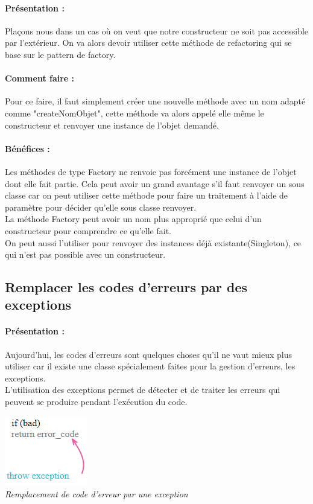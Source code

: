 \documentclass[a4paper,twoside,12pt,openright]{report}
\begin{document}
\paragraph{Présentation :}
Plaçons nous dans un cas où on veut que notre constructeur ne soit pas accessible par l'extérieur.
On va alors devoir utiliser cette méthode de refactoring qui se base sur le pattern de factory.

\paragraph{Comment faire :}
Pour ce faire, il faut simplement créer une nouvelle méthode avec un nom adapté comme "createNomObjet", cette méthode va alors appelé elle même le constructeur et renvoyer une instance de l'objet demandé.

\paragraph{Bénéfices :}
Les méthodes de type Factory ne renvoie pas forcément une instance de l'objet dont elle fait partie. Cela peut avoir un grand avantage s'il faut renvoyer un sous classe car on peut utiliser cette méthode pour faire un traitement à l'aide de paramètre pour décider qu'elle sous classe renvoyer.\\
La méthode Factory peut avoir un nom plus approprié que celui d'un constructeur pour comprendre ce qu'elle fait.\\
On peut aussi l'utiliser pour renvoyer des instances déjà existante(Singleton), ce qui n'est pas possible avec un constructeur.\\


\subsection{Remplacer les codes d'erreurs par des exceptions}
\paragraph{Présentation :}
Aujourd'hui, les codes d'erreurs sont quelques choses  qu'il ne vaut mieux plus utiliser car il existe une classe spécialement faites pour la gestion d'erreurs, les exceptions.\\
L'utilisation des exceptions permet de détecter et de traiter les erreurs qui peuvent se produire pendant l'exécution du code.\\

\begin{center}
\includegraphics[scale=1]{Image/ThrowException.png}\\
\itshape{Remplacement de code d'erreur par une exception \cite{ref8}}
\end{center}
\end{document}
